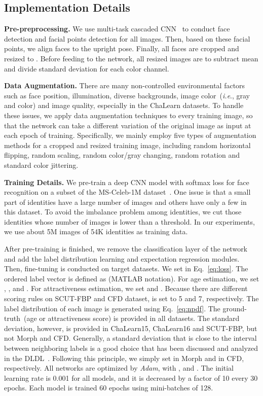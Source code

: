 \documentclass[5p,times,twocolumn]{elsarticle}
\makeatletter
\DeclareRobustCommand\onedot{\@onedot}
\def\@onedot{.}
\def\ie{\emph{i.e}\onedot}
\makeatother
\begin{document}
\subsection{Implementation Details}

\textbf{Pre-preprocessing.} We use multi-task cascaded CNN~\cite{zhang2016joint} to conduct face detection and facial points detection for all images. Then, based on these facial points, we align faces to the upright pose. Finally, all faces are cropped and resized to . Before feeding to the network, all resized images are to subtract mean and divide standard deviation for each color channel.

\textbf{Data Augmentation.} There are many non-controlled environmental factors such as face position, illumination, diverse backgrounds, image color~(\ie, gray and color) and image quality, especially in the ChaLearn datasets. To handle these issues, we apply data augmentation techniques to every training image, so that the network can take a different variation of the original image as input at each epoch of training. Specifically, we mainly employ five types of augmentation methods for a cropped and resized training image, including random horizontal flipping, random scaling, random color/gray changing, random rotation and standard color jittering.

\textbf{Training Details.} We pre-train a deep CNN model with softmax loss for face recognition on a subset of the MS-Celeb-1M dataset~\cite{guo2016ms}. One issue is that a small part of identities have a large number of images and others have only a few in this dataset. To avoid the imbalance problem among identities, we cut those identities whose number of images is lower than a threshold. In our experiments, we use about 5M images of 54K identities as training data.

After pre-training is finished, we remove the classification layer of the network and add the label distribution learning and expectation regression modules. Then, fine-tuning is conducted on target datasets. We set  in Eq.~\eqref{eq:loss}. The ordered label vector is defined as  (MATLAB notation). For age estimation, we set , , and . For attractiveness estimation, we set  and . Because there are different scoring rules on SCUT-FBP and CFD dataset,  is set to 5 and 7, respectively. The label distribution of each image is generated using Eq.~\eqref{eq:npdf}. The ground-truth~(age or attractiveness score) is provided in all datasets. The standard deviation, however, is provided in ChaLearn15, ChaLearn16 and SCUT-FBP, but not Morph and CFD. {Generally, a standard deviation  that is close to the interval between neighboring labels is a good choice that has been discussed and analyzed in the DLDL~\cite{gao2017deep}.  Following this principle,} we simply set  in Morph and  in CFD, respectively. All networks are optimized by \emph{Adam}, with ,  and . The initial learning rate is 0.001 for all models, and it is decreased by a factor of 10 every 30 epochs. Each model is trained 60 epochs using mini-batches of 128.
\end{document}
